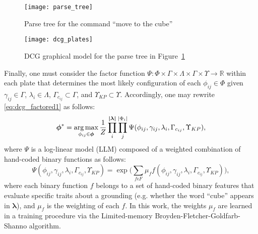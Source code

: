 \begin{figure}[b!]
\centering
\texttt{[image: parse\_tree]}
\caption{Parse tree for the command ``move to the cube''}
\label{fig:parse_tree}
\end{figure}

\begin{figure}[b!]
\centering
\texttt{[image: dcg\_plates]}
\caption{DCG graphical model for the parse tree in Figure~\ref{fig:parse_tree}}
\label{fig:dcg_plates}
\end{figure}

Finally, one must consider the factor function $\Psi : \Phi \times \Gamma \times \Lambda \times \Gamma \times \Upsilon \rightarrow
 \mathbb{R}$ within each plate that determines the most likely configuration of each $\phi_{ij} \in \Phi$ given $\gamma_{ij} \in \Gamma$, $\lambda_i \in \Lambda$, $\Gamma_{c_{ij}} \subset \Gamma$, and $\Upsilon_{KP} \subset \Upsilon$. Accordingly, one may rewrite \eqref{eq:dcg_factored1} as follows:
\begin{equation}
\boldsymbol{\phi}^* = \operatorname*{\arg\max}_{\phi_{ij} \in \boldsymbol{\phi}} \frac{1}{Z} \prod_{i}^{\boldsymbol{|\lambda|}} \prod_{j}^{|\Phi_i|} \Psi(\phi_{ij},\gamma_{ij},\lambda_i,\Gamma_{c_{ij}},\Upsilon_{KP}),
\label{eq:llm1}
\end{equation}
where $\Psi$ is a log-linear model (LLM) composed of a weighted combination of hand-coded binary functions as follows:
\begin{equation}
\Psi(\phi_{ij},\gamma_{ij},\lambda_i,\Gamma_{c_{ij}},\Upsilon_{KP}) = \exp \Big( \sum_{f \epsilon F} \mu_f f(\phi_{ij},\gamma_{ij},\lambda_i,\Gamma_{c_{ij}},\Upsilon_{KP}) \Big),
\label{eq:llm2}
\end{equation}
where each binary function $f$ belongs to a set of hand-coded binary features that evaluate specific traits about a grounding (e.g. whether the word ``cube'' appears in $\boldsymbol{\lambda}$), and $\mu_f$ is the weighting of each $f$. In this work,
the weights $\mu_f$ are learned in a training procedure via the Limited-memory Broyden-Fletcher-Goldfarb-Shanno algorithm.%